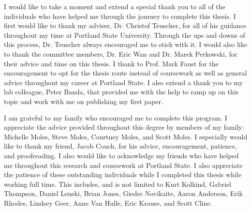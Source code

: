 I would like to take a moment and extend a special thank you to all of the individuals who have helped me through the journey to complete this thesis. I first would like to thank my adviser, Dr. Christof Teuscher, for all of his guidance throughout my time at Portland State University. Through the ups and downs of this process, Dr. Teuscher always encouraged me to stick with it. I would also like to thank the committee members, Dr. Eric Wan and Dr. Marek Perkowski, for their advice and time on this thesis. I thank to Prof. Mark Faust for the encouragement to opt for the thesis route instead of coursework as well as general advice throughout my career at Portland State. I also extend a thank you to my lab colleague, Peter Banda, that provided me with the help to ramp up on this topic and work with me on publishing my first paper.

I am grateful to my family who encouraged me to complete this program. I appreciate the advice provided throughout this degree by members of my family: Michelle Moles, Steve Moles, Courtney Moles, and Scott Moles. I especially would like to thank my friend, Jacob Couch, for his advice, encouragement, patience, and proofreading. I also would like to acknowledge my friends who have helped me throughout this research and coursework at Portland State. I also appreciate the patience of these outstanding individuals while I completed this thesis while working full time. This includes, and is not limited to Kurt Kolkind, Gabriel Thompson, Daniel Lenski, Brian Jones, Giedre Novikaite, Aaron Anderson, Erik Rhodes, Lindsey Geer, Anne Van Hulle, Eric Krause, and Scott Cline.

